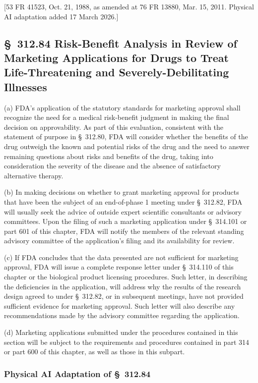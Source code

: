 \documentclass[11pt]{article}
\begin{document}
[53 FR 41523, Oct. 21, 1988, as amended at 76 FR 13880, Mar. 15, 2011. Physical AI adaptation added 17 March 2026.]

\subsection{\S~312.84 Risk-Benefit Analysis in Review of Marketing Applications for Drugs to Treat Life-Threatening and Severely-Debilitating Illnesses}

(a) FDA's application of the statutory standards for marketing approval shall recognize the need for a medical risk-benefit judgment in making the final decision on approvability. As part of this evaluation, consistent with the statement of purpose in \S~312.80, FDA will consider whether the benefits of the drug outweigh the known and potential risks of the drug and the need to answer remaining questions about risks and benefits of the drug, taking into consideration the severity of the disease and the absence of satisfactory alternative therapy.

(b) In making decisions on whether to grant marketing approval for products that have been the subject of an end-of-phase 1 meeting under \S~312.82, FDA will usually seek the advice of outside expert scientific consultants or advisory committees. Upon the filing of such a marketing application under \S~314.101 or part 601 of this chapter, FDA will notify the members of the relevant standing advisory committee of the application's filing and its availability for review.

(c) If FDA concludes that the data presented are not sufficient for marketing approval, FDA will issue a complete response letter under \S~314.110 of this chapter or the biological product licensing procedures. Such letter, in describing the deficiencies in the application, will address why the results of the research design agreed to under \S~312.82, or in subsequent meetings, have not provided sufficient evidence for marketing approval. Such letter will also describe any recommendations made by the advisory committee regarding the application.

(d) Marketing applications submitted under the procedures contained in this section will be subject to the requirements and procedures contained in part 314 or part 600 of this chapter, as well as those in this subpart.

\subsubsection{Physical AI Adaptation of \S~312.84}
\end{document}
